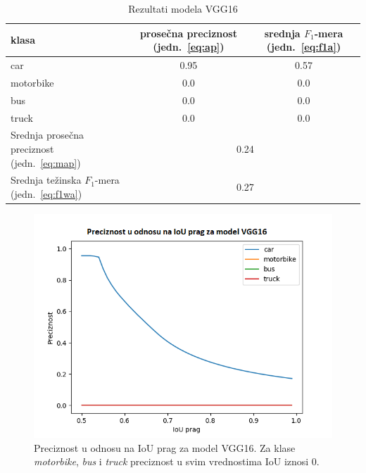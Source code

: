 \documentclass[12pt,oneside]{memoir}
\begin{document}
\begin{table}[h!]
    \begin{center}
    \caption{Rezultati modela VGG16}
    \begin{tabular}{|m{10em}|c|c|}
        \toprule
        klasa     & prosečna preciznost (jedn.~\ref{eq:ap}) & srednja $F_1$-mera (jedn.~\ref{eq:f1a})  \\ \hline
        \midrule
        car       & 0.95  & 0.57 \\ \hline
        motorbike & 0.0   & 0.0 \\ \hline
        bus       & 0.0   & 0.0 \\ \hline
        truck     & 0.0   & 0.0 \\ \hline
        \bottomrule
        Srednja prosečna preciznost (jedn.~\ref{eq:map}) & \multicolumn{2}{c|}{0.24}  \\ \hline
        Srednja težinska $F_1$-mera (jedn.~\ref{eq:f1wa}) & \multicolumn{2}{c|}{0.27}  \\ \hline
    \end{tabular}
    \label{tab:section4_vgg16_results}
    \end{center}
\end{table}


\begin{figure}[!ht]
    \centering
    \includegraphics[width=1\textwidth]{matfmaster/glava4/precision_vs_iou_threshold_VGG16.png}
    \caption{Preciznost u odnosu na IoU prag za model VGG16. Za klase \textit{motorbike}, \textit{bus} i \textit{truck} preciznost u svim vrednostima IoU iznosi 0.}
    \label{fig:section4_vgg16_prc}
\end{figure}
\end{document}
